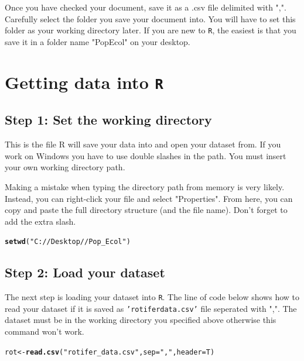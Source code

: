 \documentclass{article}\usepackage[]{graphicx}\usepackage[]{color}
\makeatletter
\newcommand{\hlstr}[1]{\textcolor[rgb]{0.192,0.494,0.8}{#1}}%
\newcommand{\hlstd}[1]{\textcolor[rgb]{0.345,0.345,0.345}{#1}}%
\newcommand{\hlkwb}[1]{\textcolor[rgb]{0.69,0.353,0.396}{#1}}%
\newcommand{\hlkwc}[1]{\textcolor[rgb]{0.333,0.667,0.333}{#1}}%
\newcommand{\hlkwd}[1]{\textcolor[rgb]{0.737,0.353,0.396}{\textbf{#1}}}%
\newenvironment{kframe}{%
 \def\at@end@of@kframe{}%
 \ifinner\ifhmode%
  \def\at@end@of@kframe{\end{minipage}}%
  \begin{minipage}{\columnwidth}%
 \fi\fi%
 \def\FrameCommand##1{\hskip\@totalleftmargin \hskip-\fboxsep
 \colorbox{shadecolor}{##1}\hskip-\fboxsep
     \hskip-\linewidth \hskip-\@totalleftmargin \hskip\columnwidth}%
 \MakeFramed {\advance\hsize-\width
   \@totalleftmargin\z@ \linewidth\hsize
   \@setminipage}}%
 {\par\unskip\endMakeFramed%
 \at@end@of@kframe}
\newenvironment{knitrout}{}{} %
\makeatother
\begin{document}
Once you have checked your document, save it as a .csv file delimited with ",". Carefully select the folder you save your document into. You will have to set this folder as your working directory later. If you are new to \texttt{R}, the easiest is that you save it in a folder name "Pop\textunderscore Ecol" on your desktop.

\section{Getting data into \texttt{R}}
\subsection{Step 1: Set the working directory}
This is the file R will save your data into and open your dataset from. If you work on Windows you have to use double slashes in the path. You must insert your own working directory path.

Making a mistake when typing the directory path from memory is very likely. Instead, you can right-click your file and select "Properties". From here, you can copy and paste the full directory structure (and the file name). Don't forget to add the extra slash.
\begin{knitrout}
\color{fgcolor}\begin{kframe}
\begin{alltt}
\hlkwd{setwd}\hlstd{(}\hlstr{"C://Desktop//Pop_Ecol"}\hlstd{)}
\end{alltt}
\end{kframe}
\end{knitrout}

\subsection{Step 2: Load your dataset}
The next step is loading your dataset into \texttt{R}. The line of code below shows how to read your dataset if it is saved as \texttt{'rotifer\textunderscore data.csv'} file seperated with ",". The dataset must be in the working directory you specified above otherwise this command won't work.
\begin{knitrout}
\color{fgcolor}\begin{kframe}
\begin{alltt}
\hlstd{rot}\hlkwb{<-}\hlkwd{read.csv}\hlstd{(}\hlstr{"rotifer_data.csv"}\hlstd{,} \hlkwc{sep}\hlstd{=}\hlstr{","}\hlstd{,} \hlkwc{header}\hlstd{=T)}
\end{alltt}
\end{kframe}
\end{knitrout}
\end{document}
